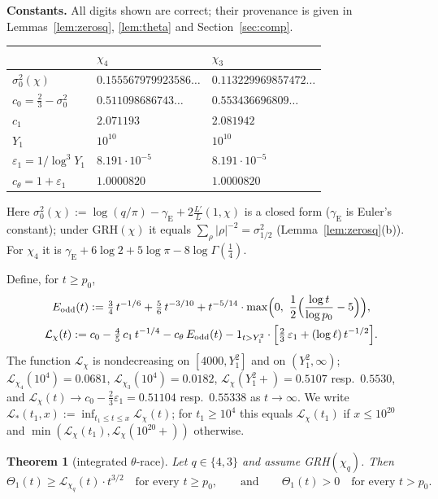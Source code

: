 \documentclass[11pt]{amsart}
\newtheorem{theorem}{Theorem}[section]
\theoremstyle{definition}
\numberwithin{equation}{section}
\newcommand{\eps}{\varepsilon}
\newcommand{\cL}{\mathcal L}          %
\begin{document}
\medskip\noindent\textbf{Constants.} All digits shown are correct;
their provenance is given in Lemmas~\ref{lem:zerosq}, \ref{lem:theta}
and Section~\ref{sec:comp}.
\begin{center}
\begin{tabular}{lll}
\toprule
 & $\chi_4$ & $\chi_3$\\
\midrule
$\sigma_0^2(\chi)$ & $0.155567979923586\ldots$ &
$0.113229969857472\ldots$\\
$c_0=\tfrac23-\sigma_0^2$ & $0.511098686743\ldots$ &
$0.553436696809\ldots$\\
$c_1$ & $2.071193$ & $2.081942$\\
$Y_1$ & $10^{10}$ & $10^{10}$\\
$\eps_1=1/\log^3Y_1$ & $8.191\cdot10^{-5}$ & $8.191\cdot10^{-5}$\\
$c_\theta=1+\eps_1$ & $1.0000820$ & $1.0000820$\\
\bottomrule
\end{tabular}
\end{center}
Here $\sigma_0^2(\chi):=\log(q/\pi)-\gamma_{\mathrm E}
+2\frac{L'}{L}(1,\chi)$ is a closed form ($\gamma_{\mathrm E}$ is
Euler's constant); under GRH$(\chi)$ it equals $\sum_\rho|\rho|^{-2}
=\sigma_{1/2}^2$ (Lemma~\ref{lem:zerosq}(b)). For $\chi_4$ it is
$\gamma_{\mathrm E}+6\log2+5\log\pi-8\log\Gamma(\tfrac14)$.

Define, for $t\ge p_0$,
\begin{gather}
E_{\mathrm{odd}}(t):=\tfrac34\,t^{-1/6}+\tfrac56\,t^{-3/10}
+t^{-5/14}\cdot\max\Bigl(0,\ \frac12\Bigl(\frac{\log t}{\log p_0}-5\Bigr)\Bigr),
\notag\\
\cL_\chi(t):=c_0-\tfrac45\,c_1\,t^{-1/4}-c_\theta\,E_{\mathrm{odd}}(t)
-1_{t>Y_1^2}\cdot\Bigl[\tfrac23\,\eps_1+(\log\ell)\,t^{-1/2}\Bigr].
\label{eq:defL}
\end{gather}
The function $\cL_\chi$ is nondecreasing on $[4000,Y_1^2]$ and on
$(Y_1^2,\infty)$; $\cL_{\chi_4}(10^4)=0.0681$,
$\cL_{\chi_3}(10^4)=0.0182$, $\cL_\chi(Y_1^2+)=0.5107$ resp.\
$0.5530$, and $\cL_\chi(t)\to c_0-\tfrac23\eps_1=0.51104$ resp.\
$0.55338$ as $t\to\infty$. We write
$\cL_*(t_1,x):=\inf_{t_1\le t\le x}\cL_\chi(t)$; for $t_1\ge10^4$
this equals $\cL_\chi(t_1)$ if $x\le10^{20}$ and
$\min(\cL_\chi(t_1),\cL_\chi(10^{20}+))$ otherwise.

\begin{theorem}[integrated $\theta$-race]\label{thm:Theta1}
Let $q\in\{4,3\}$ and assume GRH$(\chi_q)$. Then
\[
\Theta_1(t)\ge\cL_{\chi_q}(t)\cdot t^{3/2}\quad\text{for every }t\ge p_0,
\qquad\text{and}\qquad
\Theta_1(t)>0\quad\text{for every }t>p_0 .
\]
\end{theorem}
\end{document}
